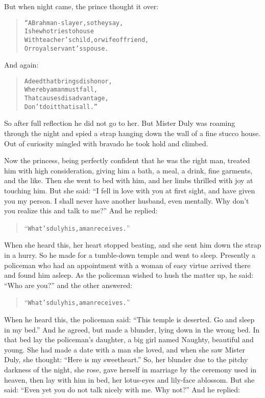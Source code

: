 \documentclass[article, twoside, 14pt]{memoir}
\renewenvironment{verbatim}{%
\begin{quote}%
\vskip -10pt%
\begin{alltt}\normalfont\large}{\end{alltt}%
\end{quote}%
\vskip -10pt
} %
\begin{document}
But when night came, the prince thought it over:

\begin{verbatim}
“A Brahman-slayer, so they say,
    Is he who tries to house
With teacher's child, or wife of friend,
    Or royal servant's spouse.
\end{verbatim}
And again:

\begin{verbatim}
A deed that brings dishonor,
    Whereby a man must fall,
That causes disadvantage,
    Don't do it{\textemdash}that is all.”
\end{verbatim}
So after full reflection he did not go to her. But Mister
Duly was roaming through the night and spied a strap hanging down
the wall of a fine stucco house. Out of curiosity mingled with
bravado he took hold and climbed.

Now the princess, being perfectly confident that he was the right
man, treated him with high consideration, giving him a bath, a
meal, a drink, fine garments, and the like. Then she went to bed
with him, and her limbs thrilled with joy at touching him. But she
said:
``I fell in love with you at first sight, and have given you my person. I shall never have another husband, even mentally. Why don't you realize this and talk to me?''
And he replied:

\begin{verbatim}
“What's duly his, a man receives.”
\end{verbatim}
When she heard this, her heart stopped beating, and she sent him
down the strap in a hurry. So he made for a tumble-down temple and
went to sleep. Presently a policeman who had an appointment with a
woman of easy virtue arrived there and found him asleep. As the
policeman wished to hush the matter up, he said: ``Who are you?''
and the other answered:

\begin{verbatim}
“What's duly his, a man receives.”
\end{verbatim}
When he heard this, the policeman said:
``This temple is deserted. Go and sleep in my bed.'' And he agreed,
but made a blunder, lying down in the wrong bed. In that bed lay
the policeman's daughter, a big girl named Naughty, beautiful and
young. She had made a date with a man she loved, and when she saw
Mister Duly, she thought: ``Here is my sweetheart.'' So, her
blunder due to the pitchy darkness of the night, she rose, gave
herself in marriage by the ceremony used in heaven, then lay with
him in bed, her lotus-eyes and lily-face ablossom. But she said:
``Even yet you do not talk nicely with me. Why not?'' And he
replied:
\end{document}
